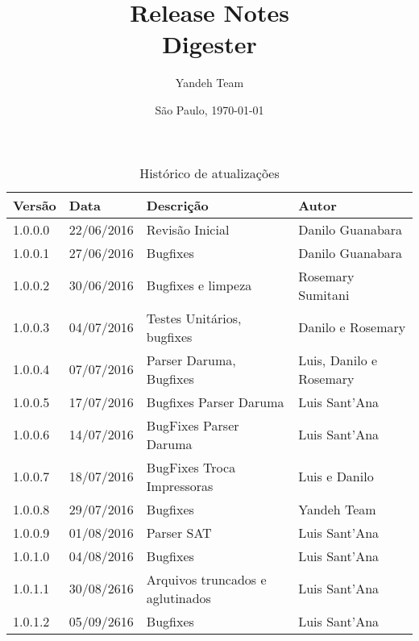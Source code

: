 \documentclass{article}      %
\title{Release Notes \\
      Digester \versiondigester}  %
\author{Yandeh Team}              %
\date{São Paulo, \today}
\begin{document}

\maketitle                   %

\thispagestyle{firststyle}


\begin{table}[!ht]
\centering
\caption{Histórico de atualizações}
\label{my-label}
\begin{tabular}{|l|l|l|l|}
\hline
\textbf{Versão} & \textbf{Data} & \textbf{Descrição}                & \textbf{Autor}                                       \\ \hline
1.0.0.0           & 22/06/2016    & Revisão Inicial                 & Danilo Guanabara                                     \\ \hline
1.0.0.1           & 27/06/2016    & Bugfixes                        & Danilo Guanabara                                     \\ \hline
1.0.0.2           & 30/06/2016    & Bugfixes e limpeza              & Rosemary Sumitani                                    \\ \hline
1.0.0.3           & 04/07/2016    & Testes Unitários, bugfixes      & Danilo e Rosemary                                    \\ \hline
1.0.0.4           & 07/07/2016    & Parser Daruma, Bugfixes         & Luis, Danilo e Rosemary                              \\ \hline
1.0.0.5           & 17/07/2016    & Bugfixes Parser Daruma          & Luis Sant'Ana                                        \\ \hline
1.0.0.6           & 14/07/2016    & BugFixes Parser Daruma          & Luis Sant'Ana                                        \\ \hline  
1.0.0.7           & 18/07/2016    & BugFixes Troca Impressoras      & Luis e Danilo                                        \\ \hline
1.0.0.8           & 29/07/2016    & Bugfixes                        & Yandeh Team                                          \\ \hline
1.0.0.9           & 01/08/2016    & Parser SAT                      & Luis Sant'Ana                                        \\ \hline
1.0.1.0           & 04/08/2016    & Bugfixes                        & Luis Sant'Ana                                        \\ \hline
1.0.1.1           & 30/08/2616    & Arquivos truncados e aglutinados              & Luis Sant'Ana                          \\ \hline
1.0.1.2           & 05/09/2616    & Bugfixes                        & Luis Sant'Ana                                         \\ \hline
\end{tabular}
\end{table}
\end{document}
